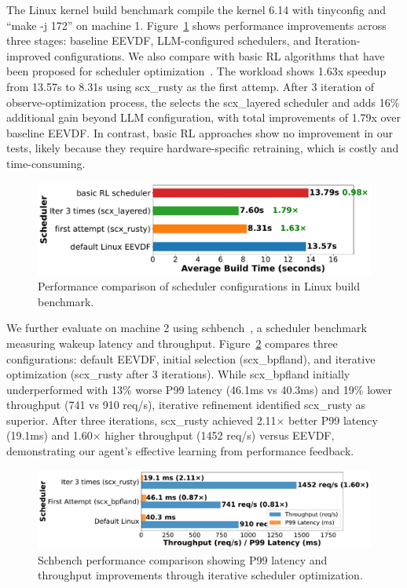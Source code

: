 The Linux kernel build benchmark compile the kernel 6.14 with tinyconfig and ``make -j 172'' on machine 1. Figure~\ref{fig:performance-comparison} shows performance improvements across three stages: baseline EEVDF, LLM-configured schedulers, and Iteration-improved configurations. We also compare with basic RL algorithms that have been proposed for scheduler optimization~\cite{corbet2025ml}. The workload shows 1.63x speedup from 13.57s to 8.31s using scx\_rusty as the first attemp. After 3 iteration of observe-optimization process, the \agent selects the scx\_layered scheduler and adds 16\% additional gain beyond LLM configuration, with total improvements of 1.79x over baseline EEVDF. In contrast, basic RL approaches show no improvement in our tests, likely because they require hardware-specific retraining, which is costly and time-consuming. 

\begin{figure}[h]
\centering
\includegraphics[width=0.9\columnwidth]{sections/Linux_build_benchmark_results.pdf}
\caption{Performance comparison of scheduler configurations in Linux build benchmark.}
\label{fig:performance-comparison}
\end{figure}

We further evaluate \sys on machine 2 using schbench~\cite{schbench2016}, a scheduler benchmark measuring wakeup latency and throughput. Figure~\ref{fig:schbench-comparison} compares three configurations: default EEVDF, initial selection (scx\_bpfland), and iterative optimization (scx\_rusty after 3 iterations). While scx\_bpfland initially underperformed with 13\% worse P99 latency (46.1ms vs 40.3ms) and 19\% lower throughput (741 vs 910 req/s), iterative refinement identified scx\_rusty as superior. After three iterations, scx\_rusty achieved 2.11× better P99 latency (19.1ms) and 1.60× higher throughput (1452 req/s) versus EEVDF, demonstrating our agent's effective learning from performance feedback.

\begin{figure}[h]
\centering
\includegraphics[width=0.9\columnwidth]{sections/schbench_performance_comparison.pdf}
\caption{Schbench performance comparison showing P99 latency and throughput improvements through iterative scheduler optimization.}
\label{fig:schbench-comparison}
\end{figure}

